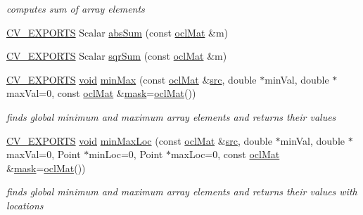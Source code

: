 \begin{DoxyCompactItemize}
\begin{DoxyCompactList}\small\item\em computes sum of array elements \end{DoxyCompactList}\item 
\hyperlink{core_2types__c_8h_a1bf9f0e121b54272da02379cfccd0a2b}{C\-V\-\_\-\-E\-X\-P\-O\-R\-T\-S} Scalar \hyperlink{namespacecv_1_1ocl_a9c91116d0e0cdeccd62b3a12b93da261}{abs\-Sum} (const \hyperlink{classcv_1_1ocl_1_1oclMat}{ocl\-Mat} \&m)
\item 
\hyperlink{core_2types__c_8h_a1bf9f0e121b54272da02379cfccd0a2b}{C\-V\-\_\-\-E\-X\-P\-O\-R\-T\-S} Scalar \hyperlink{namespacecv_1_1ocl_a1b46d5af15cde4b2e63e3bd181a11b0b}{sqr\-Sum} (const \hyperlink{classcv_1_1ocl_1_1oclMat}{ocl\-Mat} \&m)
\item 
\hyperlink{core_2types__c_8h_a1bf9f0e121b54272da02379cfccd0a2b}{C\-V\-\_\-\-E\-X\-P\-O\-R\-T\-S} \hyperlink{legacy_8hpp_a8bb47f092d473522721002c86c13b94e}{void} \hyperlink{namespacecv_1_1ocl_a5d9893ba4f46df16e328d811f849bf63}{min\-Max} (const \hyperlink{classcv_1_1ocl_1_1oclMat}{ocl\-Mat} \&\hyperlink{legacy_8hpp_a371cd109b74033bc4366f584edd3dacc}{src}, double $\ast$min\-Val, double $\ast$max\-Val=0, const \hyperlink{classcv_1_1ocl_1_1oclMat}{ocl\-Mat} \&\hyperlink{tracking_8hpp_a6b13ecd2fd6ec7ad422f1d7863c3ad19}{mask}=\hyperlink{classcv_1_1ocl_1_1oclMat}{ocl\-Mat}())
\begin{DoxyCompactList}\small\item\em finds global minimum and maximum array elements and returns their values \end{DoxyCompactList}\item 
\hyperlink{core_2types__c_8h_a1bf9f0e121b54272da02379cfccd0a2b}{C\-V\-\_\-\-E\-X\-P\-O\-R\-T\-S} \hyperlink{legacy_8hpp_a8bb47f092d473522721002c86c13b94e}{void} \hyperlink{namespacecv_1_1ocl_a7d38c60687e8f01f38323e4f9954e5cd}{min\-Max\-Loc} (const \hyperlink{classcv_1_1ocl_1_1oclMat}{ocl\-Mat} \&\hyperlink{legacy_8hpp_a371cd109b74033bc4366f584edd3dacc}{src}, double $\ast$min\-Val, double $\ast$max\-Val=0, Point $\ast$min\-Loc=0, Point $\ast$max\-Loc=0, const \hyperlink{classcv_1_1ocl_1_1oclMat}{ocl\-Mat} \&\hyperlink{tracking_8hpp_a6b13ecd2fd6ec7ad422f1d7863c3ad19}{mask}=\hyperlink{classcv_1_1ocl_1_1oclMat}{ocl\-Mat}())
\begin{DoxyCompactList}\small\item\em finds global minimum and maximum array elements and returns their values with locations \end{DoxyCompactList}\item 

\end{DoxyCompactItemize}
